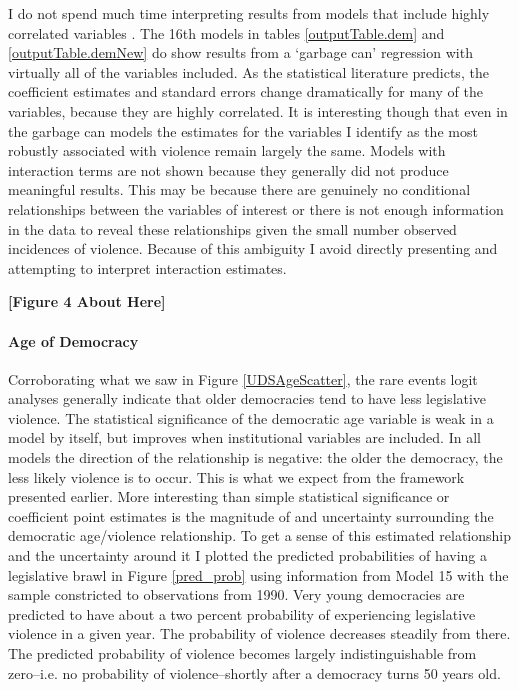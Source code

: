 \documentclass[a4paper]{article}\usepackage{graphicx, color}
\begin{document}
I do not spend much time interpreting results from models that include highly correlated variables \citep[see][]{Achen2002, Schrodt2006}. The 16th models in tables \ref{outputTable.dem} and \ref{outputTable.demNew} do show results from a `garbage can' regression with virtually all of the variables included. As the statistical literature predicts, the coefficient estimates and standard errors change dramatically for many of the variables, because they are highly correlated. It is interesting though that even in the garbage can models the estimates for the variables I identify as the most robustly associated with violence remain largely the same. Models with interaction terms are not shown because they generally did not produce meaningful results. This may be because there are genuinely no conditional relationships between the variables of interest or there is not enough information in the data to reveal these relationships given the small number observed incidences of violence. Because of this ambiguity I avoid directly presenting and attempting to interpret interaction estimates. 

\begin{center}

{\bf{[Figure 4 About Here]}}

\end{center}

\paragraph{Age of Democracy}
Corroborating what we saw in Figure \ref{UDSAgeScatter}, the rare events logit analyses generally indicate that older democracies tend to have less legislative violence. The statistical significance of the democratic age variable is weak in a model by itself, but improves when institutional variables are included. In all models the direction of the relationship is negative: the older the democracy, the less likely violence is to occur. This is what we expect from the framework presented earlier. More interesting than simple statistical significance or coefficient point estimates is the magnitude of and uncertainty surrounding the democratic age/violence relationship. To get a sense of this estimated relationship and the uncertainty around it \citep[see][]{King2000} I plotted the predicted probabilities of having a legislative brawl in Figure \ref{pred_prob} using information from Model 15 with the sample constricted to observations from 1990. Very young democracies are predicted to have about a two percent probability of experiencing legislative violence in a given year. The probability of violence decreases steadily from there. The predicted probability of violence becomes largely indistinguishable from zero--i.e. no probability of violence--shortly after a democracy turns 50 years old.
\end{document}
